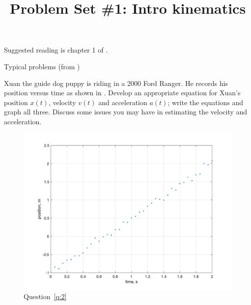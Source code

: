 \documentclass [hw]{exam}
\title{Problem Set \#1: Intro kinematics}
\author{\mobeardInstructorShort}
\date{\printdate{6/15/2021}}
\begin{document}
\maketitle

Suggested reading is chapter 1 of \citet{kleppner2014introduction}.

\begin{questions}
\question Typical problems (from \citet{hecht2018schaums})

\question\label{q:2} Xuan the guide dog puppy is riding in a 2000 Ford Ranger. He records his position versus time as shown in . Develop an appropriate equation for Xuan's position $x(t)$, velocity $v(t)$ and acceleration $a(t)$; write the equations and graph all three. Discuss some issues you may have in estimating the velocity and acceleration. 
\begin{figure}[h]
\begin{center}
\includegraphics[width=0.75\columnwidth]{hw1p2.png}
\end{center}
\caption{Question~\ref{q:2}}
\label{fig:q2}
\end{figure}


\end{questions}
\end{document}
